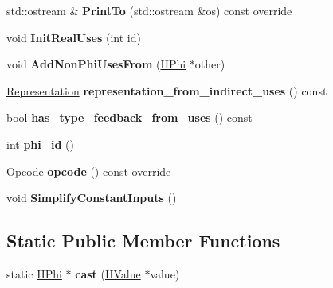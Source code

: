 \begin{DoxyCompactItemize}
\item 
std\+::ostream \& {\bfseries Print\+To} (std\+::ostream \&os) const  override\hypertarget{classv8_1_1internal_1_1_h_phi_ab04510ce1e2eed0045a6e1a0442478ea}{}\label{classv8_1_1internal_1_1_h_phi_ab04510ce1e2eed0045a6e1a0442478ea}

\item 
void {\bfseries Init\+Real\+Uses} (int id)\hypertarget{classv8_1_1internal_1_1_h_phi_aafbc6e8bf11cd4695d9e28204e2cff3a}{}\label{classv8_1_1internal_1_1_h_phi_aafbc6e8bf11cd4695d9e28204e2cff3a}

\item 
void {\bfseries Add\+Non\+Phi\+Uses\+From} (\hyperlink{classv8_1_1internal_1_1_h_phi}{H\+Phi} $\ast$other)\hypertarget{classv8_1_1internal_1_1_h_phi_a5547772b2adbd8e6054bf9c32668ca14}{}\label{classv8_1_1internal_1_1_h_phi_a5547772b2adbd8e6054bf9c32668ca14}

\item 
\hyperlink{classv8_1_1internal_1_1_representation}{Representation} {\bfseries representation\+\_\+from\+\_\+indirect\+\_\+uses} () const \hypertarget{classv8_1_1internal_1_1_h_phi_a8c610694e70132d96b5fe17cf9553c83}{}\label{classv8_1_1internal_1_1_h_phi_a8c610694e70132d96b5fe17cf9553c83}

\item 
bool {\bfseries has\+\_\+type\+\_\+feedback\+\_\+from\+\_\+uses} () const \hypertarget{classv8_1_1internal_1_1_h_phi_ac1670a7c0c1d6f1b4335489e23d95ebc}{}\label{classv8_1_1internal_1_1_h_phi_ac1670a7c0c1d6f1b4335489e23d95ebc}

\item 
int {\bfseries phi\+\_\+id} ()\hypertarget{classv8_1_1internal_1_1_h_phi_a459b618e1e716802ef349cdd96937525}{}\label{classv8_1_1internal_1_1_h_phi_a459b618e1e716802ef349cdd96937525}

\item 
Opcode {\bfseries opcode} () const  override\hypertarget{classv8_1_1internal_1_1_h_phi_a60c5017d5d5feca8f9aa0b5b662d5dc1}{}\label{classv8_1_1internal_1_1_h_phi_a60c5017d5d5feca8f9aa0b5b662d5dc1}

\item 
void {\bfseries Simplify\+Constant\+Inputs} ()\hypertarget{classv8_1_1internal_1_1_h_phi_a783af1e1da563b04b37f1628f3ee3dac}{}\label{classv8_1_1internal_1_1_h_phi_a783af1e1da563b04b37f1628f3ee3dac}

\end{DoxyCompactItemize}
\subsection*{Static Public Member Functions}
\begin{DoxyCompactItemize}
\item 
static \hyperlink{classv8_1_1internal_1_1_h_phi}{H\+Phi} $\ast$ {\bfseries cast} (\hyperlink{classv8_1_1internal_1_1_h_value}{H\+Value} $\ast$value)\hypertarget{classv8_1_1internal_1_1_h_phi_ab0b9a381e69bd3f7c169189a0f49ef76}{}\label{classv8_1_1internal_1_1_h_phi_ab0b9a381e69bd3f7c169189a0f49ef76}

\end{DoxyCompactItemize}
